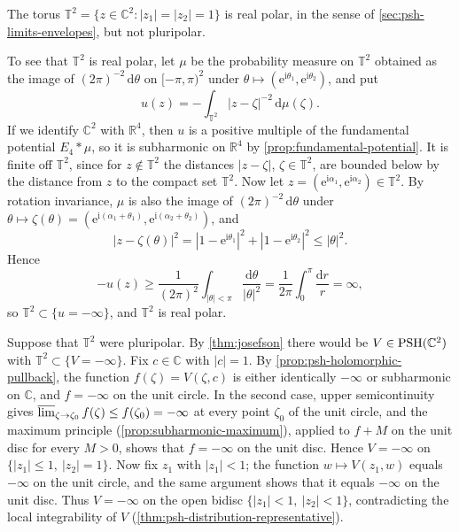 \begin{example}\label{ex:real-polar-not-pluripolar}
The torus $\mathbb T^2=\{z\in\mathbb C^2:|z_1|=|z_2|=1\}$ is real polar, in the sense of \cref{sec:psh-limits-envelopes}, but not pluripolar.

To see that $\mathbb T^2$ is real polar, let $\mu$ be the probability measure on $\mathbb T^2$ obtained as the image of $(2\pi)^{-2}\,\mathrm d\theta$ on $[-\pi,\pi)^2$ under $\theta\mapsto(\mathrm e^{\mathrm i\theta_1},\mathrm e^{\mathrm i\theta_2})$, and put
\[
 u(z)=-\int_{\mathbb T^2}|z-\zeta|^{-2}\,\mathrm d\mu(\zeta).
\]
If we identify $\mathbb C^2$ with $\mathbb R^4$, then $u$ is a positive multiple of the fundamental potential $E_4*\mu$, so it is subharmonic on $\mathbb R^4$ by \cref{prop:fundamental-potential}. It is finite off $\mathbb T^2$, since for $z\notin\mathbb T^2$ the distances $|z-\zeta|$, $\zeta\in\mathbb T^2$, are bounded below by the distance from $z$ to the compact set $\mathbb T^2$. Now let $z=(\mathrm e^{\mathrm i\alpha_1},\mathrm e^{\mathrm i\alpha_2})\in\mathbb T^2$. By rotation invariance, $\mu$ is also the image of $(2\pi)^{-2}\,\mathrm d\theta$ under $\theta\mapsto\zeta(\theta)=(\mathrm e^{\mathrm i(\alpha_1+\theta_1)},\mathrm e^{\mathrm i(\alpha_2+\theta_2)})$, and
\[
 |z-\zeta(\theta)|^2=|1-\mathrm e^{\mathrm i\theta_1}|^2+|1-\mathrm e^{\mathrm i\theta_2}|^2\le|\theta|^2.
\]
Hence
\[
 -u(z)\ge\frac1{(2\pi)^2}\int_{|\theta|<\pi}\frac{\mathrm d\theta}{|\theta|^2}
 =\frac1{2\pi}\int_0^\pi\frac{\mathrm dr}{r}=\infty,
\]
so $\mathbb T^2\subset\{u=-\infty\}$, and $\mathbb T^2$ is real polar.

Suppose that $\mathbb T^2$ were pluripolar. By \cref{thm:josefson} there would be $V\in\mathrm{PSH}(\mathbb C^2)$ with $\mathbb T^2\subset\{V=-\infty\}$. Fix $c\in\mathbb C$ with $|c|=1$. By \cref{prop:psh-holomorphic-pullback}, the function $f(\zeta)=V(\zeta,c)$ is either identically $-\infty$ or subharmonic on $\mathbb C$, and $f=-\infty$ on the unit circle. In the second case, upper semicontinuity gives $\varlimsup_{\zeta\to\zeta_0}f(\zeta)\le f(\zeta_0)=-\infty$ at every point $\zeta_0$ of the unit circle, and the maximum principle (\cref{prop:subharmonic-maximum}), applied to $f+M$ on the unit disc for every $M>0$, shows that $f=-\infty$ on the unit disc. Hence $V=-\infty$ on $\{|z_1|\le1,\ |z_2|=1\}$. Now fix $z_1$ with $|z_1|<1$; the function $w\mapsto V(z_1,w)$ equals $-\infty$ on the unit circle, and the same argument shows that it equals $-\infty$ on the unit disc. Thus $V=-\infty$ on the open bidisc $\{|z_1|<1,\ |z_2|<1\}$, contradicting the local integrability of $V$ (\cref{thm:psh-distribution-representative}).


\end{example}
